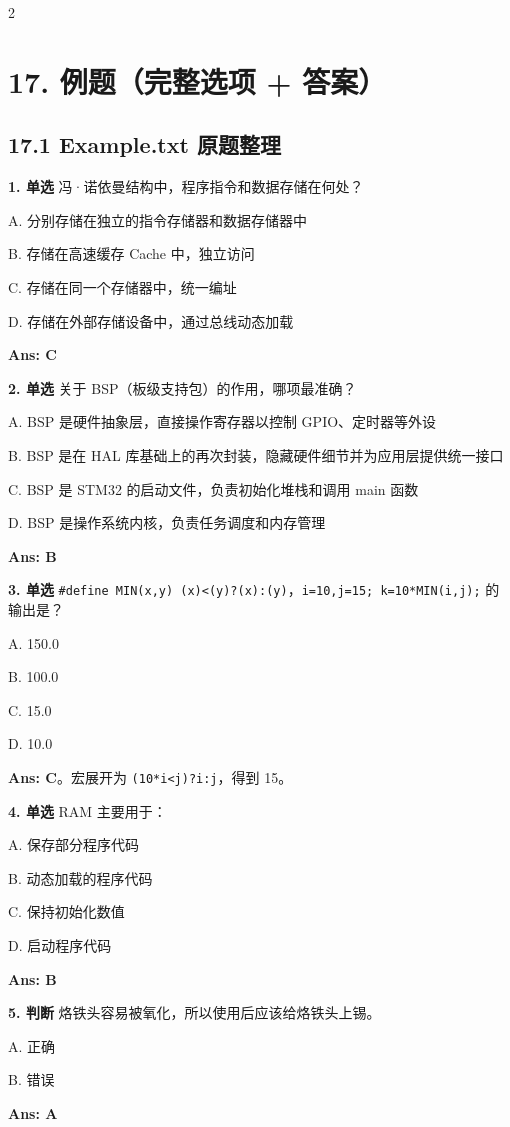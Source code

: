 \documentclass[UTF8,zihao=-5]{ctexart}
\begin{document}
\begin{multicols*}{2}
\section*{17. 例题（完整选项 + 答案）}
\subsection*{17.1 Example.txt 原题整理}
\textbf{1. 单选} 冯·诺依曼结构中，程序指令和数据存储在何处？\par
A. 分别存储在独立的指令存储器和数据存储器中\par
B. 存储在高速缓存 Cache 中，独立访问\par
C. 存储在同一个存储器中，统一编址\par
D. 存储在外部存储设备中，通过总线动态加载\par
\textbf{Ans: C}\par
\textbf{2. 单选} 关于 BSP（板级支持包）的作用，哪项最准确？\par
A. BSP 是硬件抽象层，直接操作寄存器以控制 GPIO、定时器等外设\par
B. BSP 是在 HAL 库基础上的再次封装，隐藏硬件细节并为应用层提供统一接口\par
C. BSP 是 STM32 的启动文件，负责初始化堆栈和调用 main 函数\par
D. BSP 是操作系统内核，负责任务调度和内存管理\par
\textbf{Ans: B}\par
\textbf{3. 单选} \texttt{\#define MIN(x,y) (x)\textless{}(y)?(x):(y)}，\texttt{i=10,j=15; k=10*MIN(i,j);} 的输出是？\par
A. 150.0\par
B. 100.0\par
C. 15.0\par
D. 10.0\par
\textbf{Ans: C}。宏展开为 \texttt{(10*i\textless{}j)?i:j}，得到 15。\par
\textbf{4. 单选} RAM 主要用于：\par
A. 保存部分程序代码\par
B. 动态加载的程序代码\par
C. 保持初始化数值\par
D. 启动程序代码\par
\textbf{Ans: B}\par
\textbf{5. 判断} 烙铁头容易被氧化，所以使用后应该给烙铁头上锡。\par
A. 正确\par
B. 错误\par
\textbf{Ans: A}\par

\end{multicols*}
\end{document}
